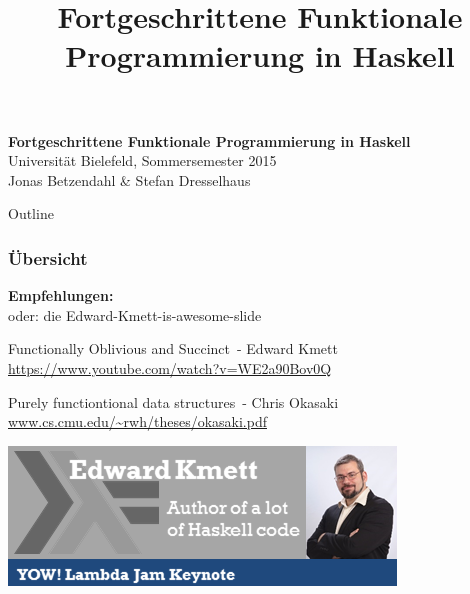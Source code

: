 \documentclass{beamer}
\title{Fortgeschrittene Funktionale Programmierung in Haskell}
\begin{document}
  

  \begin{frame}
  \begin{center}
    \huge\textbf{Fortgeschrittene Funktionale Programmierung in Haskell}\\ \bigskip
    \LARGE Universität Bielefeld, Sommersemester 2015\\ \bigskip
    \large Jonas Betzendahl \& Stefan Dresselhaus
    \end{center}
  \end{frame}


\begin{frame}[allowframebreaks]{Outline}
\frametitle{Übersicht}
\tableofcontents
\end{frame}


\begin{frame}

\textbf{Empfehlungen:}\\
\tiny oder: die Edward-Kmett-is-awesome-slide \normalsize
\bigskip

\glqq Functionally Oblivious and Succinct\grqq\ - Edward Kmett\\
\url{https://www.youtube.com/watch?v=WE2a90Bov0Q}
\bigskip

\glqq Purely functiontional data structures\grqq\ - Chris Okasaki\\
\url{www.cs.cmu.edu/~rwh/theses/okasaki.pdf}
\bigskip

\begin{center}
\includegraphics[scale=0.75]{../Woche8/kmett.png} 
\end{center}

\end{frame}

\end{document}
